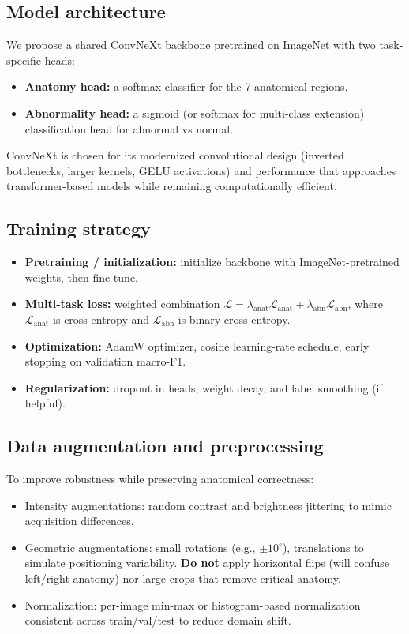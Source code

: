 \documentclass[conference]{IEEEtran}
\begin{document}
\subsection{Model architecture}
We propose a shared ConvNeXt backbone \cite{ref13,ref14} pretrained on ImageNet with two task-specific heads:
\begin{itemize}
  \item \textbf{Anatomy head:} a softmax classifier for the 7 anatomical regions.
  \item \textbf{Abnormality head:} a sigmoid (or softmax for multi-class extension) classification head for abnormal vs normal.
\end{itemize}
ConvNeXt is chosen for its modernized convolutional design (inverted bottlenecks, larger kernels, GELU activations) and performance that approaches transformer-based models while remaining computationally efficient.

\subsection{Training strategy}
\begin{itemize}
  \item \textbf{Pretraining / initialization:} initialize backbone with ImageNet-pretrained weights, then fine-tune.
  \item \textbf{Multi-task loss:} weighted combination $\mathcal{L} = \lambda_{\text{anat}} \mathcal{L}_{\text{anat}} + \lambda_{\text{abn}} \mathcal{L}_{\text{abn}}$, where $\mathcal{L}_{\text{anat}}$ is cross-entropy and $\mathcal{L}_{\text{abn}}$ is binary cross-entropy.
  \item \textbf{Optimization:} AdamW optimizer, cosine learning-rate schedule, early stopping on validation macro-F1.
  \item \textbf{Regularization:} dropout in heads, weight decay, and label smoothing (if helpful).
\end{itemize}

\subsection{Data augmentation and preprocessing}
To improve robustness while preserving anatomical correctness:
\begin{itemize}
  \item Intensity augmentations: random contrast and brightness jittering to mimic acquisition differences.
  \item Geometric augmentations: small rotations (e.g., $\pm 10^\circ$), translations to simulate positioning variability. \textbf{Do not} apply horizontal flips (will confuse left/right anatomy) nor large crops that remove critical anatomy.
  \item Normalization: per-image min-max or histogram-based normalization consistent across train/val/test to reduce domain shift.
\end{itemize}
\end{document}
